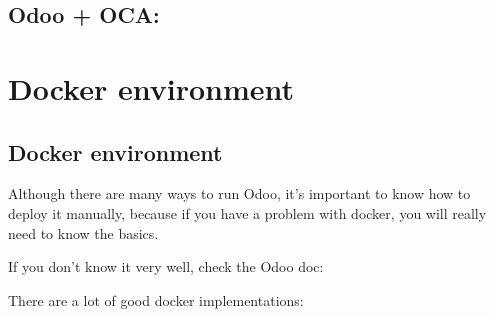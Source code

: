 \documentclass[letterpaper,10pt,english]{sphinxmanual}
\begin{document}
\section{Odoo + OCA:}
\label{\detokenize{technical:odoo-oca}}


\chapter{Docker environment}
\label{\detokenize{technical:docker-environment}}

\section{Docker environment}
\label{\detokenize{technical:id1}}
Although there are many ways to run Odoo, it’s important to know how to deploy it manually, because if you have a problem with docker, you will really need to know the basics.

If you don’t know it very well, check the Odoo doc:

\begin{sphinxVerbatim}[commandchars=\\\{\}]
\end{sphinxVerbatim}

There are a lot of good docker implementations:

\begin{sphinxVerbatim}[commandchars=\\\{\}]
\end{sphinxVerbatim}
\end{document}
